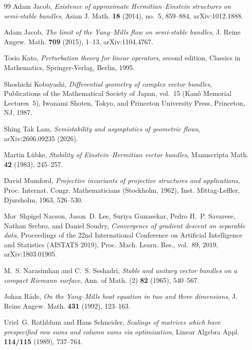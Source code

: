 \documentclass[11pt]{amsart}
\theoremstyle{definition}
\theoremstyle{remark}
\begin{document}
\begin{thebibliography}{99}
Adam Jacob, \emph{Existence of approximate {H}ermitian--{E}instein
structures on semi-stable bundles}, Asian J. Math. \textbf{18} (2014),
no.~5, 859--884, arXiv:1012.1888.

Adam Jacob, \emph{The limit of the {Y}ang--{M}ills flow on semi-stable
bundles}, J. Reine Angew. Math. \textbf{709} (2015), 1--13,
arXiv:1104.4767.

Tosio Kato, \emph{Perturbation theory for linear operators}, second edition,
Classics in Mathematics, Springer-Verlag, Berlin, 1995.

Shoshichi Kobayashi, \emph{Differential geometry of complex vector
bundles}, Publications of the Mathematical Society of Japan, vol.~15
(Kan\^o Memorial Lectures~5), Iwanami Shoten, Tokyo, and Princeton
University Press, Princeton, NJ, 1987.

Shing Tak Lam, \emph{Semistability and asymptotics of geometric flows},
arXiv:2606.09235 (2026).

Martin L{\"u}bke, \emph{Stability of {E}instein--{H}ermitian vector
bundles}, Manuscripta Math. \textbf{42} (1983), 245--257.

David Mumford, \emph{Projective invariants of projective structures and
applications}, Proc. Internat. Congr. Mathematicians (Stockholm, 1962),
Inst. Mittag-Leffler, Djursholm, 1963, 526--530.

Mor~Shpigel Nacson, Jason~D. Lee, Suriya Gunasekar, Pedro H.~P. Savarese, Nathan Srebro, and Daniel Soudry, \emph{Convergence of gradient
descent on separable data}, Proceedings of the 22nd International Conference
on Artificial Intelligence and Statistics (AISTATS 2019), Proc. Mach. Learn.
Res., vol.~89, 2019, arXiv:1803.01905.

M.~S. Narasimhan and C.~S. Seshadri, \emph{Stable and unitary vector
bundles on a compact {R}iemann surface}, Ann. of Math. (2) \textbf{82}
(1965), 540--567.

Johan R{\aa}de, \emph{On the {Y}ang--{M}ills heat equation in two
and three dimensions}, J. Reine Angew. Math. \textbf{431} (1992),
123--163.

Uriel~G. Rothblum and Hans Schneider, \emph{Scalings of matrices which
have prespecified row sums and column sums via optimization},
Linear Algebra Appl. \textbf{114/115} (1989), 737--764.


\end{thebibliography}
\end{document}
